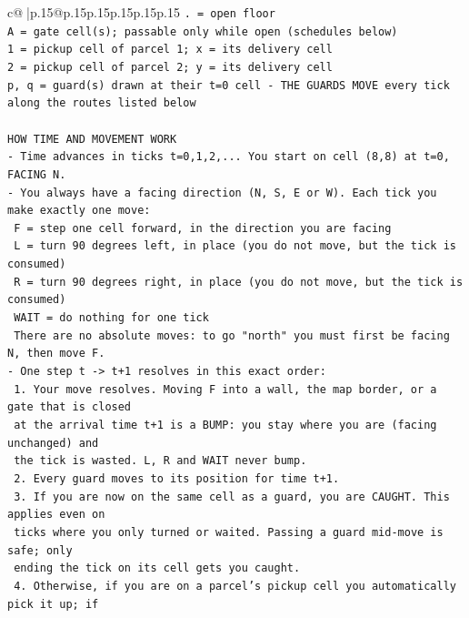 \documentclass{article}
\begin{document}
{\begin{supertabular}{c@{$\;$}|p{.15\linewidth}@{}p{.15\linewidth}p{.15\linewidth}p{.15\linewidth}p{.15\linewidth}p{.15\linewidth}}
{{{\texttt{. = open floor} \\
\texttt{A = gate cell(s); passable only while open (schedules below)} \\
\texttt{1 = pickup cell of parcel 1; x = its delivery cell} \\
\texttt{2 = pickup cell of parcel 2; y = its delivery cell} \\
\texttt{p, q = guard(s) drawn at their t=0 cell {-} THE GUARDS MOVE every tick along the routes listed below} \\
\\ 
\texttt{HOW TIME AND MOVEMENT WORK} \\
\texttt{{-} Time advances in ticks t=0,1,2,... You start on cell (8,8) at t=0, FACING N.} \\
\texttt{{-} You always have a facing direction (N, S, E or W). Each tick you make exactly one move:} \\
\texttt{  F    = step one cell forward, in the direction you are facing} \\
\texttt{  L    = turn 90 degrees left, in place (you do not move, but the tick is consumed)} \\
\texttt{  R    = turn 90 degrees right, in place (you do not move, but the tick is consumed)} \\
\texttt{  WAIT = do nothing for one tick} \\
\texttt{  There are no absolute moves: to go "north" you must first be facing N, then move F.} \\
\texttt{{-} One step t {-}> t+1 resolves in this exact order:} \\
\texttt{  1. Your move resolves. Moving F into a wall, the map border, or a gate that is closed} \\
\texttt{     at the arrival time t+1 is a BUMP: you stay where you are (facing unchanged) and} \\
\texttt{     the tick is wasted. L, R and WAIT never bump.} \\
\texttt{  2. Every guard moves to its position for time t+1.} \\
\texttt{  3. If you are now on the same cell as a guard, you are CAUGHT. This applies even on} \\
\texttt{     ticks where you only turned or waited. Passing a guard mid{-}move is safe; only} \\
\texttt{     ending the tick on its cell gets you caught.} \\
\texttt{  4. Otherwise, if you are on a parcel's pickup cell you automatically pick it up; if} \\
}}}
\end{supertabular}}
\end{document}
